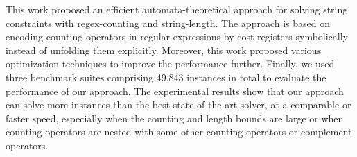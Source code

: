 
This work proposed an efficient automata-theoretical approach for solving string constraints with regex-counting and string-length. The approach is based on encoding counting operators in regular expressions by cost registers symbolically instead of unfolding them explicitly. Moreover, this work proposed various optimization techniques to improve the performance further. Finally, we used three benchmark suites comprising 49,843 instances in total to evaluate the performance of our approach. The experimental results show that our approach can solve more instances than the best state-of-the-art solver, at a comparable or faster speed, especially when the counting and length bounds are large or when counting operators are nested with some other counting operators or complement operators. 
